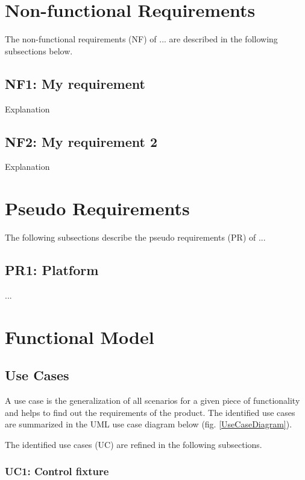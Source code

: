 	\section{Non-functional Requirements}

	The non-functional requirements (NF) of ... are described in the following subsections below.

		\subsection{NF1: My requirement}
			Explanation 
							
		\subsection{NF2: My requirement 2}
			Explanation

	\section{Pseudo Requirements}

	The following subsections describe the pseudo requirements (PR) of ...

		\subsection{PR1: Platform}
		...

	\section{Functional Model}
		\subsection{Use Cases}
		
		A use case is the generalization of all scenarios for a given piece of functionality and helps to find out the requirements of the product. The identified use cases are summarized in the UML use case diagram below (fig. \ref{UseCaseDiagram}).
		
		
		The identified use cases (UC) are refined in the following subsections.
		\subsubsection{UC1: Control fixture}

